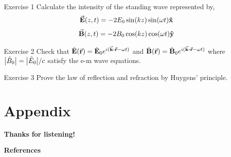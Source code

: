\documentclass{beamer}
\begin{document}
\begin{frame}{Exercise 1}
    Calculate the intensity of the standing wave represented by,
    \begin{equation}
        \va{E}(z, t) = -2E_0 \sin(kz)\sin(\omega t) \vu{x}
    \end{equation}
    \begin{equation}
        \va{B}(z, t) = -2B_0 \cos(kz)\cos(\omega t) \vu{y}
    \end{equation}

\end{frame}


\begin{frame}{Exercise 2}
    Check that $\tilde{\vb{E}}(\va{r}) = \tilde{\vb{E}}_0 e^{i(\va{k} \vdot \va{r} - \omega t)}$ and $\tilde{\vb{B}}(\va{r}) = \tilde{\vb{B}}_0 e^{i(\va{k} \vdot \va{r} - \omega t)}$ where $\abs{\tilde{B}_0} = \abs{\tilde{E}_0} / c$ satisfy the e-m wave equations.
\end{frame}

\begin{frame}{Exercise 3}
    Prove the law of reflection and refraction by Huygens' principle.
\end{frame}


\section{Appendix}


\begin{frame}
    \begin{center}
        \LARGE\bf Thanks for listening!
    \end{center}
\end{frame}



\begin{frame}{\bf References}
    \nocite{*} %
    
    
\end{frame}
\end{document}
